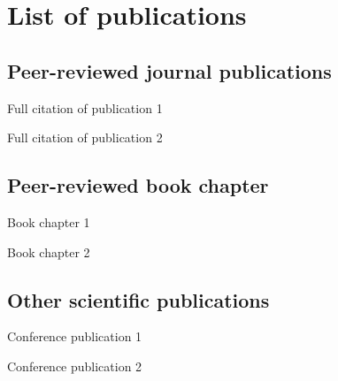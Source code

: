 \chapter[List of publications]{List of publications}

\section*{Peer-reviewed journal publications}

Full citation of publication 1

Full citation of publication 2 


\section*{Peer-reviewed book chapter}

Book chapter 1

Book chapter 2

\section*{Other scientific publications}

Conference publication 1

Conference publication 2